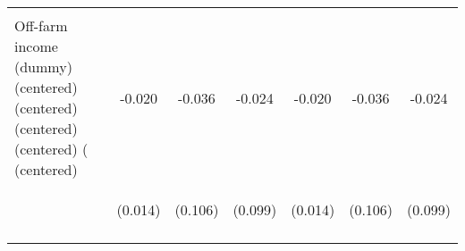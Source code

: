 \begin{center}
\begin{tabular}{lcccccc}
\vspace{4pt} & \begin{footnotesize}[0.298]\end{footnotesize} & \begin{footnotesize}[0.000]\end{footnotesize} & \begin{footnotesize}[0.000]\end{footnotesize} & \begin{footnotesize}[0.298]\end{footnotesize} & \begin{footnotesize}[0.000]\end{footnotesize} & \begin{footnotesize}[0.000]\end{footnotesize} \\
Off-farm income (dummy) (centered) (centered) (centered) (centered) ( (centered) & -0.020 & -0.036 & -0.024 & -0.020 & -0.036 & -0.024 \\
 & \begin{footnotesize}(0.014)\end{footnotesize} & \begin{footnotesize}(0.106)\end{footnotesize} & \begin{footnotesize}(0.099)\end{footnotesize} & \begin{footnotesize}(0.014)\end{footnotesize} & \begin{footnotesize}(0.106)\end{footnotesize} & \begin{footnotesize}(0.099)\end{footnotesize} \\
\vspace{4pt} & \begin{footnotesize}[0.168]\end{footnotesize} & \begin{footnotesize}[0.737]\end{footnotesize} & \begin{footnotesize}[0.809]\end{footnotesize} & \begin{footnotesize}[0.168]\end{footnotesize} & \begin{footnotesize}[0.737]\end{footnotesize} & \begin{footnotesize}[0.809]\end{footnotesize} \\

\end{tabular}
\end{center}
